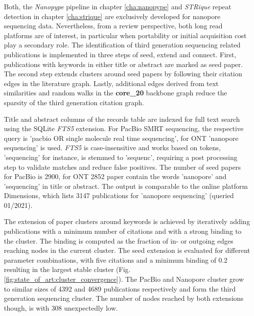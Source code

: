 Both, the \textit{Nanopype} pipeline in chapter \ref{cha:nanopype} and \textit{STRique} repeat detection in chapter \ref{cha:strique} are exclusively developed for nanopore sequencing data.
Nevertheless, from a review perspective, both long read platforms are of interest, in particular when portability or initial acquisition cost play a secondary role.
The identification of third generation sequencing related publications is implemented in three steps of seed, extend and connect.
First, publications with keywords in either title or abstract are marked as seed paper.
The second step extends clusters around seed papers by following their citation edges in the literature graph.
Lastly, additional edges derived from text similarities and random walks in the \textbf{core\_20} backbone graph reduce the sparsity of the third generation citation graph.

Title and abstract columns of the records table are indexed for full text search using the SQLite \textit{FTS5} extension. 
For PacBio SMRT sequencing, the respective query is 'pacbio OR single molecule real time sequencing', for ONT 'nanopore sequencing' is used.
\textit{FTS5} is case-insensitive and works based on tokens, 'sequencing' for instance, is stemmed to 'sequenc', requiring a post processing step to validate matches and reduce false positives.
The number of seed papers for PacBio is 2900, for ONT 2852 paper contain the words 'nanopore' and 'sequencing' in title or abstract.
The output is comparable to the online platform Dimensions, which lists 3147 publications for 'nanopore sequencing' (queried 01/2021).

The extension of paper clusters around keywords is achieved by iteratively adding publications with a minimum number of citations and with a strong binding to the cluster.
The binding is computed as the fraction of in- or outgoing edges reaching nodes in the current cluster.
The seed extension is evaluated for different parameter combinations, with five citations and a minimum binding of 0.2 resulting in the largest stable cluster (Fig. \ref{fig:state_of_art:cluster_convergence}).
The PacBio and Nanopore cluster grow to similar sizes of 4392 and 4689 publications respectively and form the third generation sequencing cluster. 
The number of nodes reached by both extensions though, is with 308 unexpectedly low.

